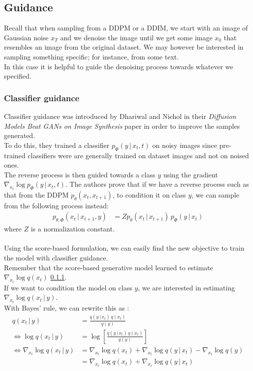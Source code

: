 \documentclass[twoside]{article}
\numberwithin{equation}{section}
\numberwithin{figure}{section}
\begin{document}
\subsection{Guidance}
Recall that when sampling from a DDPM or a DDIM, we start with an image of Gaussian noise $x_T$ and we denoise the image until we get some image $x_0$ that resembles an image from the original dataset. We may however be interested in sampling something specific; for instance, from some text. \\
In this case it is helpful to guide the denoising process towards whatever we specified.
\subsubsection{Classifier guidance}
Classifier guidance was introduced by Dhariwal and Nichol in their \textit{Diffusion Models Beat GANs on Image Synthesis} paper \cite{dhariwal2021diffusion} in order to improve the samples generated. \\
To do this, they trained a classifier $p_\Phi (y \, | \, x_t, t)$ on noisy images \cite{dhariwal2021diffusion} since pre-trained classifiers were are generally trained on dataset images and not on noised ones. \\
The reverse process is then guided towards a class $y$ using the gradient $\nabla_{x_t} \log p_\Phi (y \, | \, x_t, t)$. \cite{dhariwal2021diffusion}
The authors prove \cite{dhariwal2021diffusion} that if we have a reverse process such as that from the DDPM $p_\theta (x_t, x_{t+1})$, to condition it on class $y$, we can sample from the following process instead:
\begin{align}
  p_{\theta, \Phi} (x_t \, | \, x_{t+1}, y) &= Z p_\theta (x_t \, | \, x_{t+1}) \, p_\Phi(y \, | \, x_t)
\end{align}
where $Z$ is a normalization constant.
\\\\
Using the score-based formulation, we can easily find the new objective to train the model with classifier guidance. \cite{luo2022understanding} \\
Remember that the score-based generative model learned to estimate $\nabla_{x_t} \log q(x_t)$ \ref{}. \\
If we want to condition the model on class $y$, we are interested in estimating $\nabla_{x_t} \log q(x_t \, | \, y)$. \cite{luo2022understanding} \\
With Bayes' rule, we can rewrite this as \cite{luo2022understanding}:
\begin{align}
  q(x_t \, | \, y) &= \frac{q(y \, | \, x_t) \, q(x_t)}{q(y)}\\
  \Leftrightarrow \log q(x_t \, | \, y) &= \log \left[ \frac{q(y \, | \, x_t) \, q(x_t)}{q(y)} \right] \\
  \Leftrightarrow \nabla_{x_t} \log q(x_t \, | \, y) &= \nabla_{x_t} \log q(x_t) + \nabla_{x_t} \log q(y \, | \, x_t) - \nabla_{x_t} \log q(y) \\
  &= \nabla_{x_t} \log q(x_t) + \nabla_{x_t} \log q(y \, | \, x_t)
\end{align}
\end{document}

